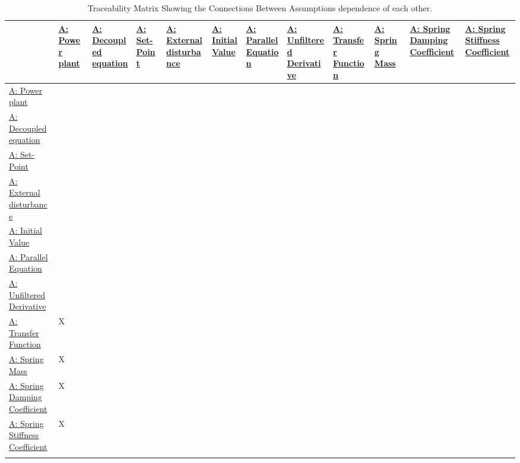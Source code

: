 \documentclass[12pt]{article}
\begin{document}
\begin{longtable}{l l l l l l l l l l l l}
\toprule
\textbf{} & \textbf{\hyperref[pwrPlant]{A: Power plant}} & \textbf{\hyperref[decoupled]{A: Decoupled equation}} & \textbf{\hyperref[setPoint]{A: Set-Point}} & \textbf{\hyperref[externalDisturb]{A: External disturbance}} & \textbf{\hyperref[initialValue]{A: Initial Value}} & \textbf{\hyperref[parallelEq]{A: Parallel Equation}} & \textbf{\hyperref[unfilteredDerivative]{A: Unfiltered Derivative}} & \textbf{\hyperref[pwrPlantTxFnx]{A: Transfer Function}} & \textbf{\hyperref[massSpring]{A: Spring Mass}} & \textbf{\hyperref[dampingCoeffSpring]{A: Spring Damping Coefficient}} & \textbf{\hyperref[stiffnessCoeffSpring]{A: Spring Stiffness Coefficient}}
\\
\midrule
\endhead
\hyperref[pwrPlant]{A: Power plant} &  &  &  &  &  &  &  &  &  &  & 
\\
\hyperref[decoupled]{A: Decoupled equation} &  &  &  &  &  &  &  &  &  &  & 
\\
\hyperref[setPoint]{A: Set-Point} &  &  &  &  &  &  &  &  &  &  & 
\\
\hyperref[externalDisturb]{A: External disturbance} &  &  &  &  &  &  &  &  &  &  & 
\\
\hyperref[initialValue]{A: Initial Value} &  &  &  &  &  &  &  &  &  &  & 
\\
\hyperref[parallelEq]{A: Parallel Equation} &  &  &  &  &  &  &  &  &  &  & 
\\
\hyperref[unfilteredDerivative]{A: Unfiltered Derivative} &  &  &  &  &  &  &  &  &  &  & 
\\
\hyperref[pwrPlantTxFnx]{A: Transfer Function} & X &  &  &  &  &  &  &  &  &  & 
\\
\hyperref[massSpring]{A: Spring Mass} & X &  &  &  &  &  &  &  &  &  & 
\\
\hyperref[dampingCoeffSpring]{A: Spring Damping Coefficient} & X &  &  &  &  &  &  &  &  &  & 
\\
\hyperref[stiffnessCoeffSpring]{A: Spring Stiffness Coefficient} & X &  &  &  &  &  &  &  &  &  & 
\\
\bottomrule
\caption{Traceability Matrix Showing the Connections Between Assumptions dependence of each other.}
\label{Table:TraceMatAvsA}
\end{longtable}
\end{document}
